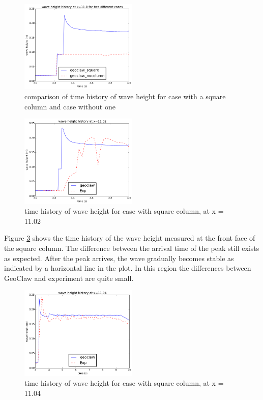 \documentclass[11pt]{article}
\begin{document}
\begin{figure}[h!]
    \centering
    \includegraphics[width=0.5\textwidth]{./plots/waveheight_x11_comparison}
    \caption{comparison of time history of wave height for case with a square column and case without one}
    \label{fig:waveheight_x11_comparison}
\end{figure}
\begin{figure}[h!]
    \centering
    \includegraphics[width=0.5\textwidth]{./plots/waveheight_square_x1102}
    \caption{time history of wave height for case with square column, at x = 11.02}
    \label{fig:waveheight_square_x=11.02}
\end{figure}
\par
Figure \ref{fig:waveheight_square_x=11.04} shows the time history of the wave height measured at the front face of the square column. 
The difference between the arrival time of the peak still exists as expected. After the peak arrives, the wave gradually becomes stable as indicated by a horizontal line in the plot. In this region the differences between GeoClaw and experiment are quite small. 
\begin{figure}[h!]
    \centering
    \includegraphics[width=0.5\textwidth]{./plots/waveheight_square_x1104_largerTimeRange}
    \caption{time history of wave height for case with square column, at x = 11.04}
    \label{fig:waveheight_square_x=11.04}
\end{figure}
\end{document}
